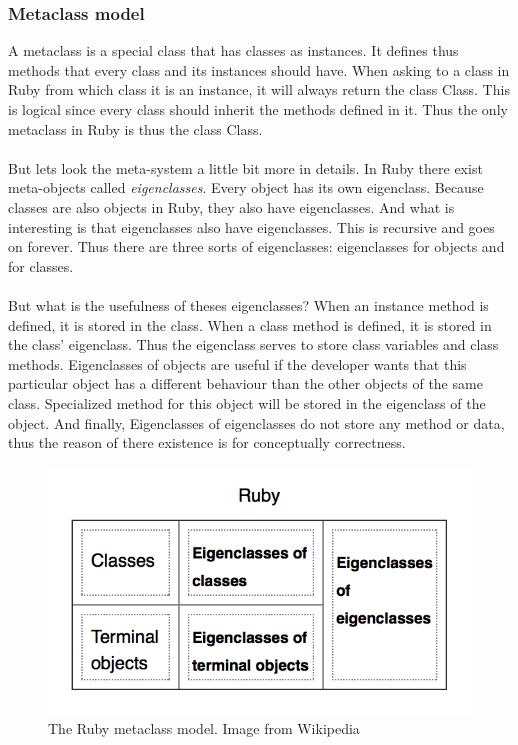 \documentclass[12pt,a4paper,twocolumn]{article}
\begin{document}
\subsubsection{Metaclass model}
\label{sec:metaclass}
A metaclass is a special class that has classes as instances. It defines thus methods that every class and its instances should have. When asking to a class in Ruby from which class it is an instance, it will always return the class Class. This is logical since every class should inherit the methods defined in it. Thus the only metaclass in Ruby is thus the class Class.
\\
\\
But lets look the meta-system a little bit more in details. In Ruby there exist meta-objects called \emph{eigenclasses}. Every object has its own eigenclass. Because classes are also objects in Ruby, they also have eigenclasses. And what is interesting is that eigenclasses also have eigenclasses. This is recursive and goes on forever. Thus there are three sorts of eigenclasses: eigenclasses for objects and for classes. 
\\
\\
But what is the usefulness of theses eigenclasses? When an instance method is defined, it is stored in the class. When a class method is defined, it is stored in the class' eigenclass. Thus the eigenclass serves to store class variables and class methods. Eigenclasses of objects are useful if the developer wants that this particular object has a different behaviour than the other objects of the same class. Specialized method for this object will be stored in the eigenclass of the object. And finally, Eigenclasses of eigenclasses do not store any method or data, thus the reason of there existence is for conceptually correctness. 
\begin{figure}[H]
\centering
\includegraphics[scale=0.5]{Ruby.png}
\caption{The Ruby metaclass model. Image from Wikipedia}
\label{fig:metaclass}
\end{figure}
\end{document}

